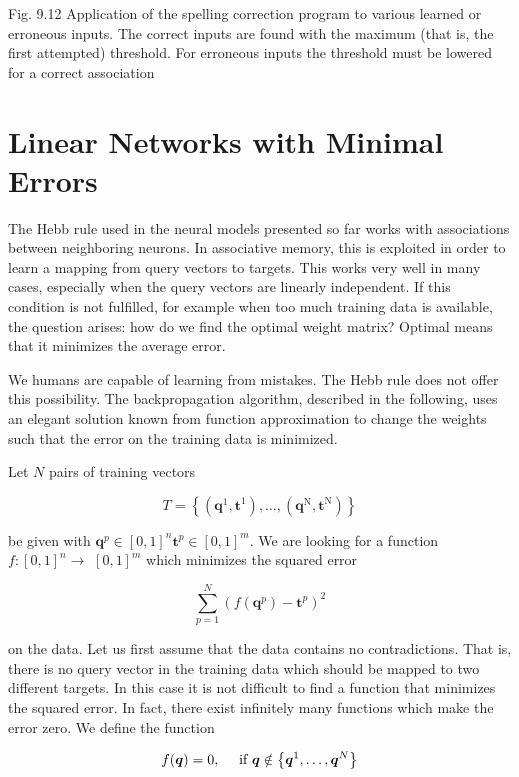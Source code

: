 \documentclass[10pt]{book}
\begin{document}
Fig. 9.12 Application of the spelling correction program to various learned or erroneous inputs. The correct inputs are found with the maximum (that is, the first attempted) threshold. For erroneous inputs the threshold must be lowered for a correct association

\section{Linear Networks with Minimal Errors}
The Hebb rule used in the neural models presented so far works with associations between neighboring neurons. In associative memory, this is exploited in order to learn a mapping from query vectors to targets. This works very well in many cases, especially when the query vectors are linearly independent. If this condition is not fulfilled, for example when too much training data is available, the question arises: how do we find the optimal weight matrix? Optimal means that it minimizes the average error.


We humans are capable of learning from mistakes. The Hebb rule does not offer this possibility. The backpropagation algorithm, described in the following, uses an elegant solution known from function approximation to change the weights such that the error on the training data is minimized.

Let $N$ pairs of training vectors

$$
T=\left\{\left(\boldsymbol{q}^{1}, \boldsymbol{t}^{1}\right), \ldots,\left(\boldsymbol{q}^{\mathrm{N}}, \boldsymbol{t}^{\mathrm{N}}\right)\right\}
$$

be given with $\boldsymbol{q}^{p} \in[0,1]^{n} \boldsymbol{t}^{p} \in[0,1]^{m}$. We are looking for a function $f:[0,1]^{n} \rightarrow$ $[0,1]^{m}$ which minimizes the squared error

$$
\sum_{p=1}^{N}\left(f\left(\boldsymbol{q}^{p}\right)-\boldsymbol{t}^{p}\right)^{2}
$$

on the data. Let us first assume that the data contains no contradictions. That is, there is no query vector in the training data which should be mapped to two different targets. In this case it is not difficult to find a function that minimizes the squared error. In fact, there exist infinitely many functions which make the error zero. We define the function

$$
f(\boldsymbol{q})=0, \quad \text { if } \boldsymbol{q} \notin\left\{\boldsymbol{q}^{1}, \ldots, \boldsymbol{q}^{N}\right\}\index{Gradient descent}\index{Learning rate}
$$
\end{document}

